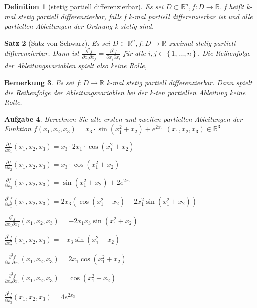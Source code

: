 \documentclass[12pt,a4paper]{scrreprt}
\newtheorem{defi}{Definition}[section]
\newtheorem{bemerkung}[defi]{Bemerkung}
\newtheorem{satz}[defi]{Satz}
\newtheorem{aufg}[defi]{Aufgabe}
\begin{document}
\begin{defi}[stetig partiell differenzierbar]
	Es sei $D\subset\mathbb{R}^n,f:D\to\mathbb{R}$. f heißt k-mal \underline{stetig partiell differenzierbar}, falls f k-mal partiell differenzierbar ist und alle partiellen Ableitungen der Ordnung k stetig sind.
\end{defi}

\begin{satz}[Satz von Schwarz]
	Es sei $D\subset\mathbb{R}^n,f:D\to\mathbb{R}$ zweimal stetig partiell differenzierbar. Dann ist $\frac{\partial^2 f}{\partial x_i \partial x_j}=\frac{\partial^2 f}{\partial x_j \partial x_i}$ für alle $i,j\in\left\{1,\dots,n\right\}$. Die Reihenfolge der Ableitungsvariablen spielt also keine Rolle,
\end{satz}

\begin{bemerkung}
	Es sei $f:D\to\mathbb{R}$ k-mal stetig partiell differenzierbar. Dann spielt die Reihenfolge der Ableitungsvariablen bei der k-ten partiellen Ableitung keine Rolle.
\end{bemerkung}

\begin{aufg}
	Berechnen Sie alle ersten und zweiten partiellen Ableitungen der Funktion $f(x_1,x_2,x_3)=x_3 \cdot \sin(x_1^2+x_2)+e^{2x_3}$ $(x_1,x_2,x_3)\in\mathbb{R}^3$

	\(\frac{\partial f}{\partial x_1}(x_1,x_2,x_3) = x_3 \cdot 2x_1 \cdot \cos(x_1^2+x_2)\)

	\(\frac{\partial f}{\partial x_2}(x_1,x_2,x_3) = x_3 \cdot \cos(x_1^2+x_2)\)

	\(\frac{\partial f}{\partial x_3}(x_1,x_2,x_3) = \sin(x_1^2+x_2) + 2e^{2x_3}\)

	\(\frac{\partial^2 f}{\partial x_1^2}(x_1,x_2,x_3) = 2x_3 \left(\cos(x_1^2+x_2) - 2x_1^2\sin(x_1^2+x_2)\right)\)

	\(\frac{\partial^2 f}{\partial x_1 \partial x_2}(x_1,x_2,x_3) = -2x_1x_3 \sin(x_1^2+x_2)\)

	\(\frac{\partial^2 f}{\partial x_2^2}(x_1,x_2,x_3) = -x_3\sin(x_1^2+x_2)\)

	\(\frac{\partial^2 f}{\partial x_1 \partial x_3}(x_1,x_2,x_3) = 2x_1 \cos(x_1^2+x_2)\)

	\(\frac{\partial^2 f}{\partial x_2 \partial x_3}(x_1,x_2,x_3) = \cos(x_1^2+x_2)\)

	\(\frac{\partial^2 f}{\partial x_3^2}(x_1,x_2,x_3) = 4e^{2x_3}\)
\end{aufg}
\end{document}
